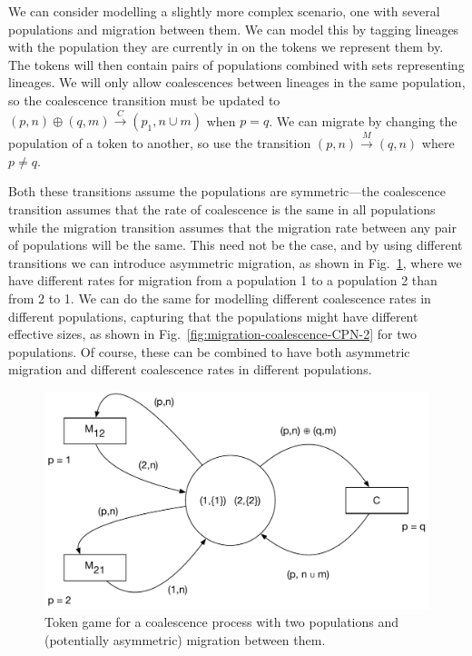 \documentclass[graybox]{svmult}
\newcommand{\trans}[3]{\ensuremath{#1 \xrightarrow{#2} #3}}
\begin{document}
We can consider modelling a slightly more complex scenario, one with several populations and migration between them. We can model this by tagging lineages with the population they are currently in on the tokens we represent them by. The tokens will then contain pairs of populations combined with sets representing lineages. We will only allow coalescences between lineages in the same population, so the coalescence transition must be updated to \trans{(p,n) \oplus (q,m)}{C}{(p_1,n\cup m)} when $p = q$. We can migrate by changing the population of a token to another, so use the transition \trans{(p,n)}{M}{(q,n)} where $p\neq q$.

Both these transitions assume the populations are symmetric---the coalescence transition assumes that the rate of coalescence is the same in all populations while the migration transition assumes that the migration rate between any pair of populations will be the same. This need not be the case, and by using different transitions we can introduce asymmetric migration, as shown in Fig.~\ref{fig:migration-coalescence-CPN}, where we have different rates for migration from a population 1 to a population 2 than from 2 to 1. We can do the same for modelling different coalescence rates in different populations, capturing that the populations might have different effective sizes, as shown in Fig.~\ref{fig:migration-coalescence-CPN-2} for two populations. Of course, these can be combined to have both asymmetric migration and different coalescence rates in different populations.


\begin{figure}[h]
\sidecaption
\includegraphics[scale=.30]{figures/migration-coalescence-CPN}
\caption{Token game for a coalescence process with two populations and (potentially asymmetric) migration between them.}
\label{fig:migration-coalescence-CPN}
\end{figure}
\end{document}
